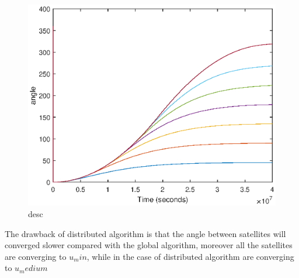 \begin{figure}[H]
	\centering
	\includegraphics[width=0.8\linewidth]{figures/da2}
	\caption{desc}
	\label{fig:da1}
\end{figure}
The drawback of distributed algorithm is that the angle between satellites will converged slower compared with the global algorithm, moreover all the satellites are converging to $u_min$, while in the case of distributed algorithm are converging to $u_medium$